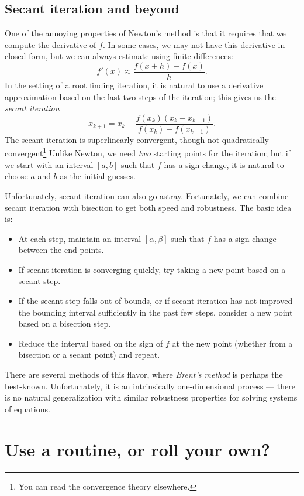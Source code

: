 \documentclass[12pt, leqno]{article} %
\begin{document}
\subsection{Secant iteration and beyond}

One of the annoying properties of Newton's method is that it requires
that we compute the derivative of $f$.  In some cases, we may not have
this derivative in closed form, but we can always estimate using
finite differences:
\[
  f'(x) \approx \frac{f(x+h)-f(x)}{h}.
\]
In the setting of a root finding iteration, it is natural to use a
derivative approximation based on the last two steps of the iteration;
this gives us the {\em secant iteration}
\[
  x_{k+1} = x_k - \frac{f(x_k)(x_k-x_{k-1})}{f(x_{k})-f(x_{k-1})}.
\]
The secant iteration is superlinearly convergent, though not
quadratically convergent\footnote{You can read the convergence
  theory elsewhere.}
Unlike Newton, we need {\em two} starting points for the iteration;
but if we start with an interval $[a,b]$ such that $f$ has a sign
change, it is natural to choose $a$ and $b$ as the initial guesses.

Unfortunately, secant iteration can also go astray.  Fortunately, we
can combine secant iteration with bisection to get both speed and
robustness.  The basic idea is:
\begin{itemize}
\item
  At each step, maintain an interval $[\alpha,\beta]$ such that $f$
  has a sign change between the end points.
\item
  If secant iteration is converging quickly, try taking a new point
  based on a secant step.
\item
  If the secant step falls out of bounds, or if secant iteration has
  not improved the bounding interval sufficiently in the past few
  steps, consider a new point based on a bisection step.
\item
  Reduce the interval based on the sign of $f$ at the new point
  (whether from a bisection or a secant point) and repeat.
\end{itemize}
There are several methods of this flavor, where {\em Brent's method}
is perhaps the best-known.
Unfortunately, it is an intrinsically one-dimensional process ---
there is no natural generalization with similar robustness properties
for solving systems of equations.

\section*{Use a routine, or roll your own?}
\end{document}
